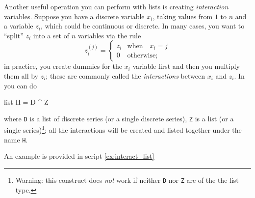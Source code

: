 Another useful operation you can perform with lists is creating
\emph{interaction} variables. Suppose you have a discrete variable
$x_i$, taking values from $1$ to $n$ and a variable $z_i$, which could
be continuous or discrete. In many cases, you want to ``split'' $z_i$
into a set of $n$ variables via the rule
\[
z^{(j)}_i =\left\{ 
    \begin{array}{ll}
      z_i & \mathrm{when} \quad x_i = j \\
      0 & \mathrm{otherwise;}
    \end{array}
    \right. 
\] 
in practice, you create dummies for the $x_i$ variable first and then
you multiply them all by $z_i$; these are commonly called the
\emph{interactions} between $x_i$ and $z_i$. In  you can do 
\begin{code}
  list H = D ^ Z
\end{code}
where \texttt{D} is a list of discrete series (or a single discrete
series), \texttt{Z} is a list (or a single series)\footnote{Warning:
  this construct does \emph{not} work if neither \texttt{D} nor
  \texttt{Z} are of the the list type.}; all the interactions will be
created and listed together under the name \texttt{H}.

An example is provided in script \ref{ex:interact_list}

